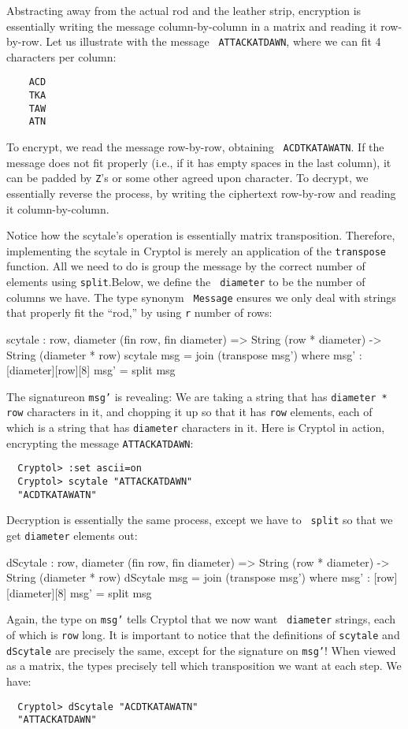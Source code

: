 Abstracting away from the actual rod and the leather strip, encryption
is essentially writing the message column-by-column in a matrix and
reading it row-by-row.  Let us illustrate with the message {\tt
  ATTACKATDAWN}, where we can fit 4 characters per column:
\begin{verbatim}
    ACD
    TKA
    TAW
    ATN
\end{verbatim}
To encrypt, we read the message row-by-row, obtaining {\tt
  ACDTKATAWATN}. If the message does not fit properly (i.e., if it has
empty spaces in the last column), it can be padded by {\tt Z}'s or
some other agreed upon character. To decrypt, we essentially reverse
the process, by writing the ciphertext row-by-row and reading it
column-by-column.

Notice how the scytale's operation is essentially matrix
transposition.  Therefore, implementing the scytale in Cryptol is
merely an application of the {\tt transpose} function.\indTranspose
All we need to do is group the message by the correct number of
elements using {\tt split}.\indSplit Below, we define the {\tt
  diameter} to be the number of columns we have. The type synonym {\tt
  Message} ensures we only deal with strings that properly fit the
``rod,'' by using {\tt r} number of rows:\indJoin

\begin{code}
  scytale : {row, diameter} (fin row, fin diameter)
            => String (row * diameter) -> String (diameter * row)
  scytale msg = join (transpose msg')
       where   msg' : [diameter][row][8]
               msg' = split msg
\end{code}
The signature\indSignature on {\tt msg'} is revealing: We are taking a
string that has {\tt diameter * row} characters in it, and chopping it
up so that it has {\tt row} elements, each of which is a string that
has {\tt diameter} characters in it.  Here is Cryptol in action,
encrypting the message {\tt ATTACKATDAWN}:
\begin{Verbatim}
  Cryptol> :set ascii=on
  Cryptol> scytale "ATTACKATDAWN"
  "ACDTKATAWATN"
\end{Verbatim}
Decryption is essentially the same process, except we have to {\tt
  split} so that we get {\tt diameter} elements
out:\indSplit\indJoin\indScytale
\begin{code}
  dScytale : {row, diameter} (fin row, fin diameter) 
             => String (row * diameter) -> String (diameter * row)
  dScytale msg = join (transpose msg')
     where   msg' : [row][diameter][8]
             msg' = split msg
\end{code}
Again, the type on {\tt msg'} tells Cryptol that we now want {\tt
  diameter} strings, each of which is {\tt row} long.  It is important
to notice that the definitions of {\tt scytale} and {\tt dScytale} are
precisely the same, except for the signature on {\tt msg'}! When
viewed as a matrix, the types precisely tell which transposition we
want at each step.  We have:
\begin{Verbatim}
  Cryptol> dScytale "ACDTKATAWATN"
  "ATTACKATDAWN"
\end{Verbatim}

